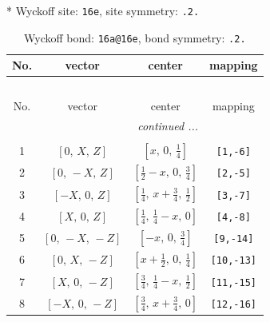 \documentclass[fleqn,8pt]{jsarticle}
\begin{document}
* Wyckoff site: {\tt 16e}, site symmetry: {\tt .2.}
\renewcommand{\arraystretch}{1.2}
\begin{longtable}{cccc}
\caption{Wyckoff bond: {\tt 16a@16e}, bond symmetry: {\tt .2.}}
 \\
 \hline \hline
No. & vector & center & mapping \\ \hline \endfirsthead

\multicolumn{3}{l}{\tablename\ \thetable{}} \\
 \hline \hline
No. & vector & center & mapping \\ \hline \endhead

 \hline \hline
\multicolumn{3}{r}{\footnotesize\it continued ...} \\ \endfoot

 \hline \hline
\multicolumn{3}{r}{} \\ \endlastfoot

1 & $\left[ 0,\, X,\, Z \right]$ & $\left[ x,\, 0,\, \frac{1}{4} \right]$ & {\tt [1,-6]} \\ \hline
2 & $\left[ 0,\, - X,\, Z \right]$ & $\left[ \frac{1}{2} - x,\, 0,\, \frac{3}{4} \right]$ & {\tt [2,-5]} \\ \hline
3 & $\left[ - X,\, 0,\, Z \right]$ & $\left[ \frac{1}{4},\, x + \frac{3}{4},\, \frac{1}{2} \right]$ & {\tt [3,-7]} \\ \hline
4 & $\left[ X,\, 0,\, Z \right]$ & $\left[ \frac{1}{4},\, \frac{1}{4} - x,\, 0 \right]$ & {\tt [4,-8]} \\ \hline
5 & $\left[ 0,\, - X,\, - Z \right]$ & $\left[ - x,\, 0,\, \frac{3}{4} \right]$ & {\tt [9,-14]} \\ \hline
6 & $\left[ 0,\, X,\, - Z \right]$ & $\left[ x + \frac{1}{2},\, 0,\, \frac{1}{4} \right]$ & {\tt [10,-13]} \\ \hline
7 & $\left[ X,\, 0,\, - Z \right]$ & $\left[ \frac{3}{4},\, \frac{1}{4} - x,\, \frac{1}{2} \right]$ & {\tt [11,-15]} \\ \hline
8 & $\left[ - X,\, 0,\, - Z \right]$ & $\left[ \frac{3}{4},\, x + \frac{3}{4},\, 0 \right]$ & {\tt [12,-16]} \\
\end{longtable}
\renewcommand{\arraystretch}{1.2}
\end{document}
